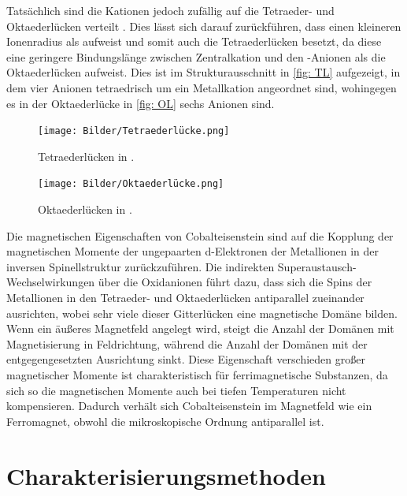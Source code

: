 \documentclass[a4paper,12pt,bibliography=totocnumbered]{scrartcl}
\begin{document}
Tatsächlich sind die Kationen jedoch zufällig auf die Tetraeder- und Oktaederlücken verteilt \cite{Rieck}.
Dies lässt sich darauf zurückführen, dass  einen kleineren Ionenradius als  aufweist und somit auch die Tetraederlücken besetzt, da diese eine geringere Bindungslänge zwischen Zentralkation und den -Anionen als die Oktaederlücken aufweist.
Dies ist im Strukturausschnitt in \autoref{fig: TL} aufgezeigt, in dem vier Anionen tetraedrisch um ein Metallkation angeordnet sind, wohingegen es in der Oktaederlücke in \autoref{fig: OL} sechs Anionen sind.


\begin{figure}[H]
    \centering
    \texttt{[image: Bilder/Tetraederlücke.png]}
    \caption{Tetraederlücken in .\cite{Rieck}}
    \label{fig: TL}
\end{figure}

\begin{figure}[H]
    \centering
    \texttt{[image: Bilder/Oktaederlücke.png]}
    \caption{Oktaederlücken in .\cite{Rieck}}
    \label{fig: OL}
\end{figure}

Die magnetischen Eigenschaften von Cobalteisenstein sind auf die Kopplung der magnetischen Momente der ungepaarten d-Elektronen der Metallionen in  der inversen Spinellstruktur zurückzuführen. \cite{Müller}
Die indirekten Superaustausch-Wechselwirkungen über die Oxidanionen führt dazu, dass sich die Spins der Metallionen in den Tetraeder- und Oktaederlücken antiparallel zueinander ausrichten, wobei sehr viele dieser Gitterlücken eine magnetische Domäne bilden. 
Wenn ein äußeres Magnetfeld angelegt wird, steigt die Anzahl der Domänen mit Magnetisierung in Feldrichtung, während die Anzahl der Domänen mit der entgegengesetzten Ausrichtung sinkt. 
Diese Eigenschaft verschieden großer magnetischer Momente ist charakteristisch für ferrimagnetische Substanzen, da sich so die magnetischen Momente auch bei tiefen Temperaturen nicht kompensieren. 
Dadurch verhält sich Cobalteisenstein im Magnetfeld wie ein Ferromagnet, obwohl die mikroskopische Ordnung antiparallel ist. \cite{Müller}

\section{Charakterisierungsmethoden}
\end{document}
